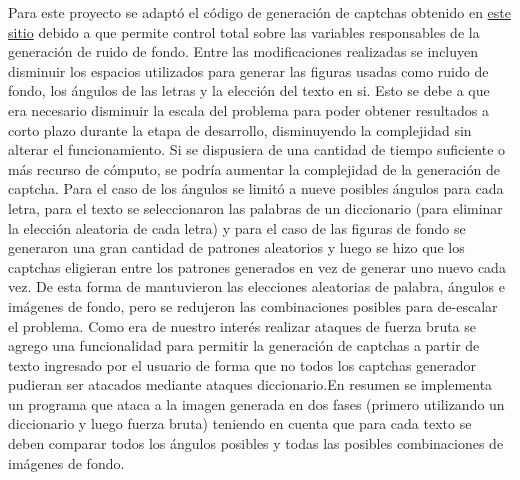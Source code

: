 \documentclass[conference]{IEEEtran}
\begin{document}
Para este proyecto se adaptó el código de generación de captchas obtenido en \href{https://javadiscover.blogspot.com/2013/07/creating-captcha-using-java.html}{este sitio}\cite{b1} debido a que permite control total sobre las variables responsables de la generación de ruido de fondo. Entre las modificaciones realizadas se incluyen disminuir los espacios utilizados para generar las figuras usadas como ruido de fondo, los ángulos de las letras y la elección del texto en si. Esto se debe a que era necesario disminuir la escala del problema para poder obtener resultados a corto plazo durante la etapa de desarrollo, disminuyendo la complejidad sin alterar el funcionamiento. Si se dispusiera de una cantidad de tiempo suficiente o más recurso de cómputo, se podría aumentar la complejidad de la generación de captcha.  Para el caso de los ángulos se limitó a nueve posibles ángulos para cada letra, para el texto se seleccionaron las palabras de un diccionario (para eliminar la elección aleatoria de cada letra) y para el caso de las figuras de fondo se generaron una gran cantidad de patrones aleatorios y luego se hizo que los captchas eligieran entre los patrones generados en vez de generar uno nuevo cada vez. De esta forma de mantuvieron las elecciones aleatorias de palabra, ángulos e imágenes de fondo, pero se redujeron las combinaciones posibles para de-escalar el problema. Como era de nuestro interés realizar ataques de fuerza bruta se agrego una funcionalidad para permitir la generación de captchas a partir de texto ingresado por el usuario de forma que no todos los captchas generador pudieran ser atacados mediante ataques diccionario.\newline En resumen se implementa un programa que ataca a la imagen generada en dos fases (primero utilizando un diccionario y luego fuerza bruta) teniendo en cuenta que para cada texto se deben comparar todos los ángulos posibles y todas las posibles combinaciones de imágenes de fondo.
\end{document}
